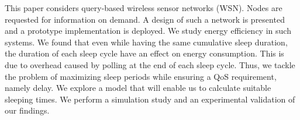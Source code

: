 This paper considers query-based wireless sensor networks (WSN). Nodes are requested for information on demand. A design of such a network is presented and a prototype implementation is deployed. We study energy efficiency in such systems. We found that even while having the same cumulative sleep duration, the duration of each sleep cycle have an effect on energy consumption. This is due to overhead caused by polling at the end of each sleep cycle. Thus, we tackle the problem of maximizing sleep periods while ensuring a QoS requirement, namely delay. We explore a model that will enable us to calculate suitable sleeping times. We perform a simulation study and an experimental validation of our findings.

